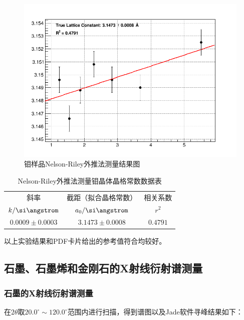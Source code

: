 \documentclass{thuemp}
\begin{document}
\begin{figure}[H]
    \centering
    \includegraphics[width=0.8\linewidth]{../Data/Fit_mo_xrd.png}
    \caption{钼样品Nelson-Riley外推法测量结果图}
    \label{fig:mo_xrd_extrapol}
\end{figure}

\begin{table}[H]
    \centering
    \captionnamefont{\wuhao\bf\heiti}
    \captiontitlefont{\wuhao\bf\heiti}
    \caption{Nelson-Riley外推法测量钼晶体晶格常数数据表}
    \label{tab:mo_xrd_extrapol}
    \liuhao
    \begin{tabular}{ccc}
        \toprule
        斜率 & 截距（拟合晶格常数） & 相关系数 \\
        $k/\text{\si\angstrom}$ & $a_0/\text{\si\angstrom}$ & $r^2$\\
        \midrule
        $0.0009 \pm 0.0003$ & $3.1473 \pm 0.0008$ & $0.4791$ \\
        \bottomrule
    \end{tabular}
\end{table}

以上实验结果和PDF卡片给出的参考值符合均较好。

\subsection{石墨、石墨烯和金刚石的X射线衍射谱测量}

\subsubsection{石墨的X射线衍射谱测量}

在$2\theta$取$20.0^\circ \sim 120.0^\circ$范围内进行扫描，得到谱图以及Jade软件寻峰结果如下：
\end{document}
